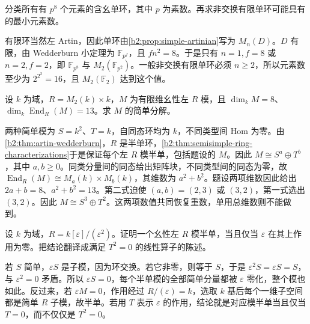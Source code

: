 \begin{exercise}\label{b2:ex:13-smallest-noncommutative-simple}
	分类所有有 \(p^8\) 个元素的含幺单环，其中 \(p\) 为素数。再求非交换有限单环可能具有的最小元素数。
\end{exercise}
\begin{solution}
	有限环当然左 Artin，因此单环由\cref{b2:prop:simple-artinian}写为 \(M_n(D)\)。\(D\) 有限，由 Wedderburn 小定理为 \(\mathbb F_{p^f}\)，且 \(fn^2=8\)。于是只有 \(n=1,f=8\) 或 \(n=2,f=2\)，即 \(\mathbb F_{p^8}\) 与 \(M_2(\mathbb F_{p^2})\)。一般非交换有限单环必须 \(n\ge2\)，所以元素数至少为 \(2^{2^2}=16\)，且 \(M_2(\mathbb F_2)\) 达到这个值。
\end{solution}

\begin{exercise}\label{b2:ex:13-recover-multiplicities}
	设 \(k\) 为域，\(R=M_2(k)\times k\)，\(M\) 为有限维幺性左 \(R\) 模，且 \(\dim_kM=8\)、\(\dim_k\operatorname{End}_R(M)=13\)。求 \(M\) 的简单分解。
\end{exercise}
\begin{solution}
	两种简单模为 \(S=k^2\)、\(T=k\)，自同态环均为 \(k\)，不同类型间 Hom 为零。由\cref{b2:thm:artin-wedderburn}，\(R\) 是半单环，\cref{b2:thm:semisimple-ring-characterizations}于是保证每个左 \(R\) 模半单，包括题设的 \(M\)。因此 \(M\cong S^a\oplus T^b\)，其中 \(a,b\ge0\)。同类分量间的同态给出矩阵块，不同类型间的同态为零，故 \(\operatorname{End}_R(M)\cong M_a(k)\times M_b(k)\)，其维数为 \(a^2+b^2\)。题设两项维数因此给出 \(2a+b=8\)、\(a^2+b^2=13\)。第二式迫使 \((a,b)=(2,3)\) 或 \((3,2)\)，第一式选出 \((3,2)\)。因此 \(M\cong S^3\oplus T^2\)。这两项数值共同恢复重数，单用总维数则不能做到。
\end{solution}

\begin{exercise}\label{b2:ex:13-dual-numbers-semisimple-modules}
	设 \(k\) 为域，\(R=k[\varepsilon]/(\varepsilon^2)\)。证明一个幺性左 \(R\) 模半单，当且仅当 \(\varepsilon\) 在其上作用为零。把结论翻译成满足 \(T^2=0\) 的线性算子的陈述。
\end{exercise}
\begin{solution}
	若 \(S\) 简单，\(\varepsilon S\) 是子模，因为环交换。若它非零，则等于 \(S\)，于是 \(\varepsilon^2S=\varepsilon S=S\)，与 \(\varepsilon^2=0\) 矛盾。所以 \(\varepsilon S=0\)，每个半单模的全部简单分量都被 \(\varepsilon\) 零化，整个模也如此。反过来，若 \(\varepsilon M=0\)，作用经过 \(R/(\varepsilon)=k\)，选取 \(k\) 基后每个一维子空间都是简单 \(R\) 子模，故半单。若用 \(T\) 表示 \(\varepsilon\) 的作用，结论就是对应模半单当且仅当 \(T=0\)，而不仅仅是 \(T^2=0\)。
\end{solution}

